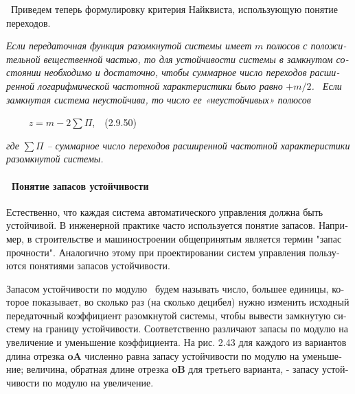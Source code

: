 \documentclass[a4paper]{article}
\begin{document}
{\begin{russian}\sffamily
\ Приведем теперь формулировку критерия Найквиста, использующую понятие переходов.
\end{russian}}

{\begin{russian}\sffamily
\textit{Если передаточная функция разомкнутой системы имеет } $m$\textit{ полюсов с положительной вещественной частью,
то для устойчивости системы в замкнутом состоянии необходимо и достаточно, чтобы суммарное число переходов расширенной
логарифмической частотной характеристики было равно } $+m/2$\textit{. \ Если замкнутая система неустойчива, то число ее
«неустойчивых» полюсов}
\end{russian}}

{\begin{russian}\sffamily
\ \ \textenglish{\ \ } $z=m-2\sum Π$,\ \ (2.9.50)
\end{russian}}

{\begin{russian}\sffamily
\textit{где } $\sum Π$\textit{ – суммарное число переходов расширенной частотной характеристики разомкнутой системы.}
\end{russian}}

\paragraph[\ Понятие запасов устойчивости]{\ Понятие запасов устойчивости}
{\begin{russian}\sffamily
Естественно, что каждая система автоматического управления должна быть устойчивой. В инженерной практике часто
используется понятие запасов. Например, в строительстве и машиностроении общепринятым является термин "запас
прочности". Аналогично этому при проектировании систем управления пользуются понятиями запасов устойчивости.
\end{russian}}

{\begin{russian}\sffamily
Запасом устойчивости по модулю \ будем называть число, большее единицы, которое показывает, во сколько раз (на сколько
децибел) нужно изменить исходный передаточный коэффициент разомкнутой системы, чтобы вывести замкнутую систему на
границу устойчивости. Соответственно различают запасы по модулю на увеличение и уменьшение коэффициента. На рис. 2.43
для каждого из вариантов длина отрезка \textbf{oA} численно равна запасу устойчивости по модулю на уменьшение;
величина, обратная длине отрезка \textenglish{\textbf{oB}} для третьего варианта, - запасу устойчивости по модулю на
увеличение.
\end{russian}}
\end{document}
